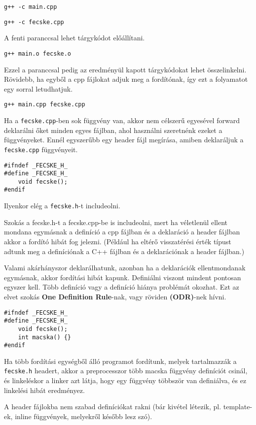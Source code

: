 \documentclass[a4paper,11.5pt,table]{article}
\begin{document}
    {\centering\texttt{g++ -c main.cpp}\par}

	{\centering\texttt{g++ -c fecske.cpp}\par}

	A fenti paranccsal lehet tárgykódot előállítani.
	
	{\centering\texttt{g++ main.o fecske.o}\par}
	
	Ezzel a paranccsal pedig az eredményül kapott tárgykódokat lehet összelinkelni. Rövidebb, ha egyből a cpp fájlokat adjuk meg a fordítónak, így ezt a folyamatot egy sorral letudhatjuk.

	{\centering\texttt{g++ main.cpp fecske.cpp} \par}
	
	Ha a \texttt{fecske.cpp}-ben sok függvény van, akkor nem célszerű egyesével forward deklarálni őket minden egyes fájlban, ahol használni szeretnénk ezeket a függvényeket. Ennél egyszerűbb egy header fájl megírása, amiben deklaráljuk a \texttt{fecske.cpp} függvényeit.
	\bigskip
	
	\begin{lstlisting}
#ifndef _FECSKE_H_
#define _FECSKE_H_
	void fecske();
#endif
	\end{lstlisting}
	Ilyenkor elég a \texttt{fecske.h}-t includeolni.
	
	Szokás a fecske.h-t a fecske.cpp-be is includeolni, mert ha véletlenül ellent mondana egymásnak a definíció a cpp fájlban és a deklaráció a header fájlban akkor a fordító hibát fog jelezni. (Például ha eltérő visszatérési érték típust adtunk meg a definíciónak a C++ fájlban és a deklarációnak a header fájlban.)
	
	Valami akárhányszor deklarálhatunk, azonban ha a deklarációk ellentmondanak egymásnak, akkor fordítási hibát kapunk. Definiálni viszont mindent pontosan egyszer kell. Több definíció vagy a definíció hiánya problémát okozhat. Ezt az elvet szokás \textbf{One Definition Rule}-nak, vagy röviden \textbf{(ODR)}-nek hívni.
	\bigskip
	
	\begin{lstlisting}
#ifndef _FECSKE_H_
#define _FECSKE_H_
	void fecske();
	int macska() {}
#endif
	\end{lstlisting}
		
	Ha több fordítási egységből álló programot fordítunk, melyek tartalmazzák a \texttt{fecske.h} headert, akkor a preprocesszor több macska függvény definíciót csinál, és linkeléskor a linker azt látja, hogy egy függvény többször van definiálva, és ez linkelési hibát eredményez.
	\begin{note}
		A header fájlokba nem szabad definíciókat rakni (bár kivétel létezik, pl. template-ek, inline függvények, melyekről később lesz szó).
	\end{note}
	
\end{document}
